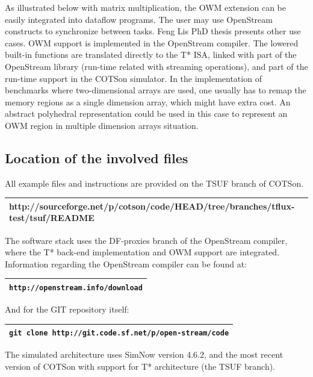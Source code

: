\documentclass[a4paper]{article}
\begin{document}
{
As illustrated below with matrix multiplication, the OWM extension can
be easily integrated into dataflow programs. The user may use
OpenStream constructs to synchronize between tasks. Feng
Li{\textquotesingle}s PhD thesis presents other use cases. OWM support
is implemented in the OpenStream compiler. The lowered built-in
functions are translated directly to the T* ISA, linked with part of
the OpenStream library (run-time related with streaming operations),
and part of the run-time support in the COTSon simulator. In the
implementation of benchmarks where two-dimensional arrays are used, one
usually has to remap the memory regions as a single dimension array,
which might have extra cost. An abstract polyhedral representation
could be used in this case to represent an OWM region in multiple
dimension arrays situation.}

\subsection[Location of the involved files]{Location of the involved
files}
{
All example files and instructions are provided on the TSUF branch of
COTSon.}

\begin{flushleft}
\tablehead{}
\begin{supertabular}{|m{6.22196in}|}
\hline
{}\ttfamily
http://sourceforge.net/p/cotson/code/HEAD/tree/branches/tflux-test/tsuf/README\\\hline
\end{supertabular}
\end{flushleft}
{
The software stack uses the DF-proxies branch of the OpenStream
compiler, where the T* back-end implementation and OWM support are
integrated. Information regarding the OpenStream compiler can be found
at:}

\begin{flushleft}
\tablehead{}
\begin{supertabular}{|m{6.22196in}|}
\hline
{}
\texttt{http://openstream.info/download}\\\hline
\end{supertabular}
\end{flushleft}
{
And for the GIT repository itself:}

\begin{flushleft}
\tablehead{}
\begin{supertabular}{|m{6.22196in}|}
\hline
{} \texttt{git clone
http://git.code.sf.net/p/open-stream/code}\\\hline
\end{supertabular}
\end{flushleft}
{
The simulated architecture uses SimNow version 4.6.2, and the most
recent version of COTSon with support for T* architecture (the TSUF
branch).}
\end{document}

